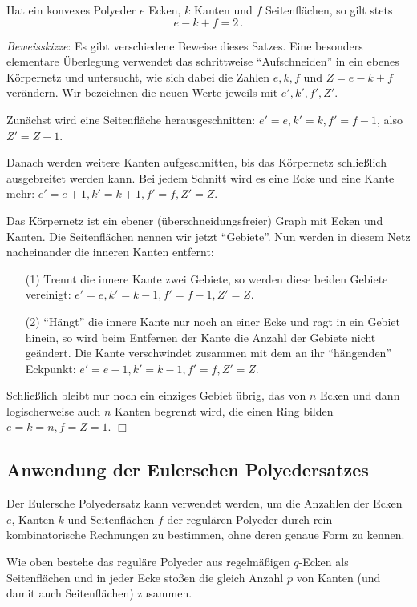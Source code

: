 \documentclass[11pt]{article}
\begin{document}
\begin{satz}
Hat ein konvexes Polyeder $e$ Ecken, $k$ Kanten und $f$ Seitenflächen,
so gilt stets \[e-k+f=2\,.\]
\end{satz}

\emph{Beweisskizze}: Es gibt verschiedene Beweise dieses Satzes. Eine
besonders elementare Über\-legung verwendet das schrittweise
``Aufschneiden'' in ein ebenes Körpernetz und untersucht, wie sich
dabei die Zahlen $e,k,f$ und $Z=e-k+f$ verändern. Wir bezeichnen die
neuen Werte jeweils mit $e',k',f',Z'$.

Zunächst wird eine Seitenfläche herausgeschnitten: $e'=e, k'=k,
f'=f-1$, also $Z'=Z-1$.

Danach werden weitere Kanten aufgeschnitten, bis das Körpernetz
schließlich ausgebreitet werden kann. Bei jedem Schnitt wird es eine
Ecke und eine Kante mehr: $e'=e+1, k'=k+1, f'=f, Z'=Z$.

Das Körpernetz ist ein ebener (überschneidungsfreier) Graph mit Ecken
und Kanten. Die Seitenflächen nennen wir jetzt ``Gebiete''.  Nun
werden in diesem Netz nacheinander die inneren Kanten entfernt:
\begin{itemize}
\item[(1)] Trennt die innere Kante zwei Gebiete, so werden diese beiden
  Gebiete vereinigt: $e'=e, k'=k-1, f'=f-1, Z'=Z$.
\item [(2)] ``Hängt'' die innere Kante nur noch an einer Ecke und ragt
  in ein Gebiet hinein, so wird beim Entfernen der Kante die Anzahl
  der Gebiete nicht geändert. Die Kante verschwindet zusammen mit dem
  an ihr ``hängenden'' Eckpunkt: $e'=e-1,k'=k-1,f'=f, Z'=Z$.
\end{itemize}
Schließlich bleibt nur noch ein einziges Gebiet übrig, das von $n$
Ecken und dann logischerweise auch $n$ Kanten begrenzt wird, die einen
Ring bilden $e=k=n, f=Z=1$. $\Box$\medskip

\subsection*{Anwendung der Eulerschen Polyedersatzes}

Der Eulersche Polyedersatz kann verwendet werden, um die Anzahlen der Ecken
$e$, Kanten $k$ und Seitenflächen $f$ der regulären Polyeder durch rein
kombinatorische Rechnungen zu bestimmen, ohne deren genaue Form zu kennen.

Wie oben bestehe das reguläre Polyeder aus regelmäßigen $q$-Ecken als
Seitenflächen und in jeder Ecke stoßen die gleich Anzahl $p$ von Kanten (und
damit auch Seitenflächen) zusammen.
\end{document}
